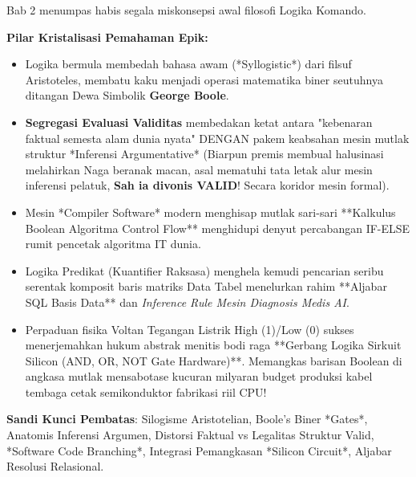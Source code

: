\documentclass[../main]{subfiles}
\begin{document}
\begin{rangkuman}
Bab 2 menumpas habis segala miskonsepsi awal filosofi Logika Komando.

\textbf{Pilar Kristalisasi Pemahaman Epik:}
\begin{itemize}
  \item Logika bermula membedah bahasa awam (*Syllogistic*) dari filsuf Aristoteles, membatu kaku menjadi operasi matematika biner seutuhnya ditangan Dewa Simbolik \textbf{George Boole}.
  \item \textbf{Segregasi Evaluasi Validitas} membedakan ketat antara "kebenaran faktual semesta alam dunia nyata" DENGAN pakem keabsahan mesin mutlak struktur *Inferensi Argumentative* (Biarpun premis membual halusinasi melahirkan Naga beranak macan, asal mematuhi tata letak alur mesin inferensi pelatuk, \textbf{Sah ia divonis VALID}! Secara koridor mesin formal).
  \item Mesin *Compiler Software* modern menghisap mutlak sari-sari **Kalkulus Boolean Algoritma Control Flow** menghidupi denyut percabangan IF-ELSE rumit pencetak algoritma IT dunia.
  \item Logika Predikat (Kuantifier Raksasa) menghela kemudi pencarian seribu serentak komposit baris matriks Data Tabel menelurkan rahim **Aljabar SQL Basis Data** dan \textit{Inference Rule Mesin Diagnosis Medis AI}.
  \item Perpaduan fisika Voltan Tegangan Listrik High (1)/Low (0) sukses menerjemahkan hukum abstrak menitis bodi raga **Gerbang Logika Sirkuit Silicon (AND, OR, NOT Gate Hardware)**. Memangkas barisan Boolean di angkasa mutlak mensabotase kucuran milyaran budget produksi kabel tembaga cetak semikonduktor fabrikasi riil CPU!
\end{itemize}

\textbf{Sandi Kunci Pembatas}: Silogisme Aristotelian, Boole's Biner *Gates*, Anatomis Inferensi Argumen, Distorsi Faktual vs Legalitas Struktur Valid, *Software Code Branching*, Integrasi Pemangkasan *Silicon Circuit*, Aljabar Resolusi Relasional.
\end{rangkuman}

\ifSubfilesClassLoaded{
  \renewcommand{\bibname}{Daftar Pustaka}
  
  
}{}
\end{document}
